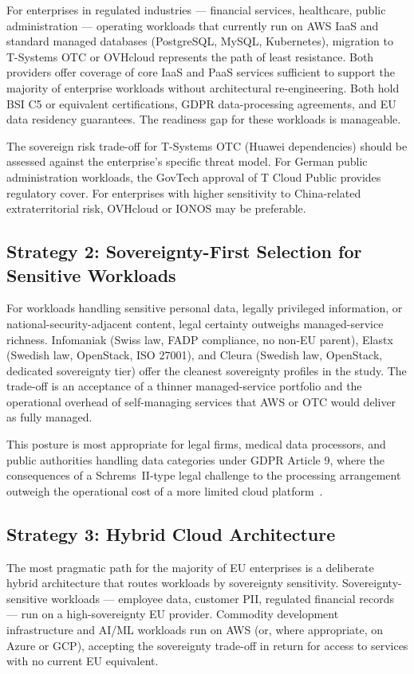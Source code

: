 For enterprises in regulated industries — financial services, healthcare, public administration — operating workloads that currently run on AWS IaaS and standard managed databases (PostgreSQL, MySQL, Kubernetes), migration to T-Systems OTC or OVHcloud represents the path of least resistance. Both providers offer coverage of core IaaS and PaaS services sufficient to support the majority of enterprise workloads without architectural re-engineering. Both hold BSI C5 or equivalent certifications, GDPR data-processing agreements, and EU data residency guarantees. The readiness gap for these workloads is manageable.

The sovereign risk trade-off for T-Systems OTC (Huawei dependencies) should be assessed against the enterprise's specific threat model. For German public administration workloads, the GovTech approval of T Cloud Public provides regulatory cover. For enterprises with higher sensitivity to China-related extraterritorial risk, OVHcloud or IONOS may be preferable.

\subsection{Strategy 2: Sovereignty-First Selection for Sensitive Workloads}

For workloads handling sensitive personal data, legally privileged information, or national-security-adjacent content, legal certainty outweighs managed-service richness. Infomaniak (Swiss law, FADP compliance, no non-EU parent), Elastx (Swedish law, OpenStack, ISO 27001), and Cleura (Swedish law, OpenStack, dedicated sovereignty tier) offer the cleanest sovereignty profiles in the study. The trade-off is an acceptance of a thinner managed-service portfolio and the operational overhead of self-managing services that AWS or OTC would deliver as fully managed.

This posture is most appropriate for legal firms, medical data processors, and public authorities handling data categories under GDPR Article 9, where the consequences of a Schrems~II-type legal challenge to the processing arrangement outweigh the operational cost of a more limited cloud platform~\cite{SchremsII_2020}.

\subsection{Strategy 3: Hybrid Cloud Architecture}

The most pragmatic path for the majority of EU enterprises is a deliberate hybrid architecture that routes workloads by sovereignty sensitivity. Sovereignty-sensitive workloads — employee data, customer PII, regulated financial records — run on a high-sovereignty EU provider. Commodity development infrastructure and AI/ML workloads run on AWS (or, where appropriate, on Azure or GCP), accepting the sovereignty trade-off in return for access to services with no current EU equivalent.

